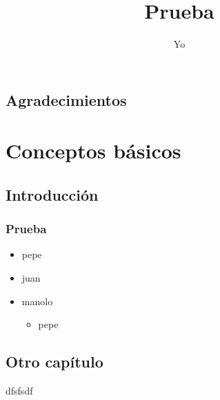 \documentclass[a4paper,11pt]{memoir}
\title{Prueba}
\author{Yo}
\begin{document}
\frontmatter

\tableofcontents

\chapter{Agradecimientos}

\mainmatter

\part{Conceptos básicos}

\chapter{Introducción}

\section{Prueba}

\lipsum


\begin{itemize}
  \item pepe
  \item juan
  \item manolo
  \begin{itemize}
    \item pepe
  \end{itemize}
\end{itemize}


\chapter{Otro capítulo}

dfsfsdf
\end{document}
